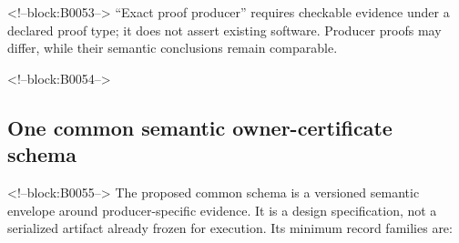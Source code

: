 \documentclass[11pt,a4paper]{article}
\begin{document}
<!--block:B0053-->
``Exact proof producer'' requires checkable evidence under a declared proof type; it does not assert existing software. Producer proofs may differ, while their semantic conclusions remain comparable.

<!--block:B0054-->
\hypertarget{one-common-semantic-owner-certificate-schema}{%
\subsection{One common semantic owner-certificate schema}\label{one-common-semantic-owner-certificate-schema}}

<!--block:B0055-->
The proposed common schema is a versioned semantic envelope around producer-specific evidence. It is a design specification, not a serialized artifact already frozen for execution. Its minimum record families are:
\end{document}
